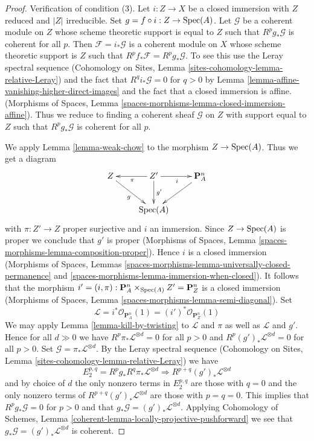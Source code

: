 \begin{proof}
\medskip\noindent
Verification of condition (3). Let $i : Z \to X$ be a closed immersion
with $Z$ reduced and $|Z|$ irreducible. Set $g = f \circ i : Z \to \mathop{\mathrm{Spec}}(A)$.
Let $\mathcal{G}$ be a coherent module on $Z$ whose scheme theoretic support
is equal to $Z$ such that $R^pg_*\mathcal{G}$ is coherent for all $p$.
Then $\mathcal{F} = i_*\mathcal{G}$ is a coherent module on
$X$ whose scheme theoretic support is $Z$ such that
$R^pf_*\mathcal{F} = R^pg_*\mathcal{G}$. To see this use
the Leray spectral sequence
(Cohomology on Sites, Lemma \ref{sites-cohomology-lemma-relative-Leray})
and the fact that $R^qi_*\mathcal{G} = 0$ for $q > 0$ by
Lemma \ref{lemma-affine-vanishing-higher-direct-images}
and the fact that a closed immersion is affine.
(Morphisms of Spaces, Lemma
\ref{spaces-morphisms-lemma-closed-immersion-affine}).
Thus we reduce to finding a coherent sheaf $\mathcal{G}$ on $Z$
with support equal to $Z$ such that $R^pg_*\mathcal{G}$ is coherent
for all $p$.

\medskip\noindent
We apply Lemma \ref{lemma-weak-chow} to the morphism $Z \to \mathop{\mathrm{Spec}}(A)$.
Thus we get a diagram
$$
\xymatrix{
Z \ar[rd]_g & Z' \ar[d]^-{g'} \ar[l]^\pi \ar[r]_i & \mathbf{P}^n_A \ar[dl] \\
& \Spec(A) &
}
$$
with $\pi : Z' \to Z$ proper surjective and $i$ an immersion.
Since $Z \to \mathop{\mathrm{Spec}}(A)$ is proper we conclude that $g'$ is proper
(Morphisms of Spaces, Lemma \ref{spaces-morphisms-lemma-composition-proper}).
Hence $i$ is a closed immersion
(Morphisms of Spaces, Lemmas
\ref{spaces-morphisms-lemma-universally-closed-permanence} and
\ref{spaces-morphisms-lemma-immersion-when-closed}).
It follows that the morphism
$i' = (i, \pi) : \mathbf{P}^n_A \times_{\mathop{\mathrm{Spec}}(A)} Z' = \mathbf{P}^n_Z$ is
a closed immersion
(Morphisms of Spaces, Lemma \ref{spaces-morphisms-lemma-semi-diagonal}).
Set
$$
\mathcal{L} =
i^*\mathcal{O}_{\mathbf{P}^n_A}(1) =
(i')^*\mathcal{O}_{\mathbf{P}^n_Z}(1)
$$
We may apply Lemma \ref{lemma-kill-by-twisting}
to $\mathcal{L}$ and $\pi$ as well as $\mathcal{L}$ and $g'$.
Hence for all $d \gg 0$ we have
$R^p\pi_*\mathcal{L}^{\otimes d} = 0$ for all $p > 0$ and
$R^p(g')_*\mathcal{L}^{\otimes d} = 0$ for all $p > 0$.
Set $\mathcal{G} = \pi_*\mathcal{L}^{\otimes d}$.
By the Leray spectral sequence
(Cohomology on Sites, Lemma \ref{sites-cohomology-lemma-relative-Leray})
we have
$$
E_2^{p, q} = R^pg_* R^q\pi_*\mathcal{L}^{\otimes d}
\Rightarrow
R^{p + q}(g')_*\mathcal{L}^{\otimes d}
$$
and by choice of $d$ the only nonzero terms in $E_2^{p, q}$ are
those with $q = 0$ and the only nonzero terms of
$R^{p + q}(g')_*\mathcal{L}^{\otimes d}$ are those with $p = q = 0$.
This implies that $R^pg_*\mathcal{G} = 0$ for $p > 0$ and
that $g_*\mathcal{G} = (g')_*\mathcal{L}^{\otimes d}$.
Applying
Cohomology of Schemes, Lemma
\ref{coherent-lemma-locally-projective-pushforward}
we see that $g_*\mathcal{G} = (g')_*\mathcal{L}^{\otimes d}$ is
coherent.


\end{proof}
